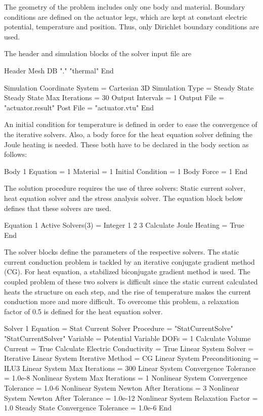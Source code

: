 The geometry of the problem includes only one body and
material. Boundary conditions are defined on the actuator legs, which
are kept at constant electric potential, temperature and
position. Thus, only Dirichlet boundary conditions are used.

The header and simulation blocks of the solver input file are

\ttbegin
Header
  Mesh DB "." "thermal"
End

Simulation
  Coordinate System = Cartesian 3D
  Simulation Type = Steady State
  Steady State Max Iterations = 30
  Output Intervals = 1
  Output File = "actuator.result"
  Post File = "actuator.vtu"
End
\ttend

An initial condition for temperature is defined in order to ease the
convergence of the iterative solvers. Also, a body force for the
heat equation solver defining the Joule heating is needed. These
both have to be declared in the body section as follows:

\ttbegin
Body 1
  Equation = 1
  Material = 1
  Initial Condition = 1
  Body Force = 1
End
\ttend

The solution procedure requires the use of three solvers: Static
current solver, heat equation solver and the stress analysis
solver. The equation block below defines that these solvers are
used. 

\ttbegin
Equation 1
  Active Solvers(3) = Integer 1 2 3
  Calculate Joule Heating = True
End
\ttend

The solver blocks define the parameters of the respective solvers. The
static current conduction problem is tackled by an iterative conjugate
gradient method (CG). For heat equation, a stabilized biconjugate
gradient method is used. The coupled problem of these two solvers is
difficult since the static current calculated heats the structure on
each step, and the rise of temperature makes the current conduction
more and more difficult. To overcome this problem, a relaxation factor
of 0.5 is defined for the heat equation solver.

\ttbegin
Solver 1
  Equation = Stat Current Solver
  Procedure = "StatCurrentSolve" "StatCurrentSolver"
  Variable = Potential
  Variable DOFs = 1
  Calculate Volume Current = True
  Calculate Electric Conductivity = True
  Linear System Solver = Iterative
  Linear System Iterative Method = CG
  Linear System Preconditioning = ILU3
  Linear System Max Iterations = 300
  Linear System Convergence Tolerance = 1.0e-8
  Nonlinear System Max Iterations = 1
  Nonlinear System Convergence Tolerance = 1.0-6
  Nonlinear System Newton After Iterations = 3
  Nonlinear System Newton After Tolerance = 1.0e-12
  Nonlinear System Relaxation Factor = 1.0
  Steady State Convergence Tolerance = 1.0e-6
End

